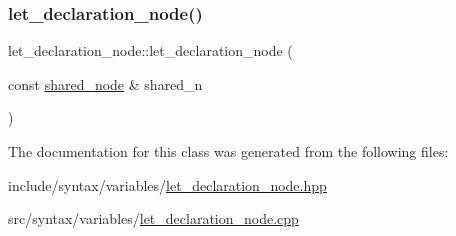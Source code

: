 \subsubsection{\texorpdfstring{let\+\_\+declaration\+\_\+node()}{let\_declaration\_node()}}
{\footnotesize\ttfamily let\+\_\+declaration\+\_\+node\+::let\+\_\+declaration\+\_\+node (\begin{DoxyParamCaption}\item[{const \hyperlink{namespacejawe_a3f307481d921b6cbb50cc8511fc2b544}{shared\+\_\+node} \&}]{shared\+\_\+n }\end{DoxyParamCaption})}



The documentation for this class was generated from the following files\+:\begin{DoxyCompactItemize}
\item 
include/syntax/variables/\hyperlink{let__declaration__node_8hpp}{let\+\_\+declaration\+\_\+node.\+hpp}\item 
src/syntax/variables/\hyperlink{let__declaration__node_8cpp}{let\+\_\+declaration\+\_\+node.\+cpp}\end{DoxyCompactItemize}
